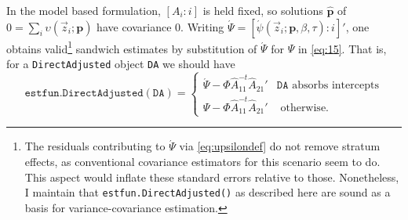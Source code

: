 \documentclass{article}
\newcommand{\absorbInterceptsEF}{\upsilon}
\begin{document}
In the model based formulation, $[A_{i}: i]$ is held fixed, so
solutions $\hat{\mathbf{p}}$ of
$0 = \sum_{i}\absorbInterceptsEF(\vec{z}_{i}; \mathbf{p})$ have
covariance 0.  Writing $\acute{\Psi} =
[\acute{\psi}(\vec{z}_{i}; \mathbf{p}, \beta, \tau) : i]'$, one
obtains valid\footnote{%
The residuals contributing to $\acute{\Psi}$ via \eqref{eq:upsilondef} do not remove stratum
effects, as conventional covariance estimators for this scenario
seem to do.  This aspect would inflate these standard errors
relative to those. Nonetheless, I maintain that
\texttt{estfun.DirectAdjusted()} as described here are sound as a
basis for variance-covariance estimation.}
  sandwich estimates by substitution of $\acute{\Psi}$ for
$\Psi$ in \eqref{eq:15}.  That is, for a
\texttt{DirectAdjusted} object \texttt{DA} we should have
\begin{equation*}
\mathtt{estfun.DirectAdjusted(DA)} = 
  \begin{cases}
  \acute{\Psi} -
  \Phi
  \hat{A}_{11}^{-t}\hat{A}_{21}'& \mathtt{DA} \text{ absorbs
    intercepts}\\
\Psi -
  \Phi
  \hat{A}_{11}^{-t}\hat{A}_{21}'  & \text{ otherwise}.
\end{cases}
\end{equation*}
\end{document}
